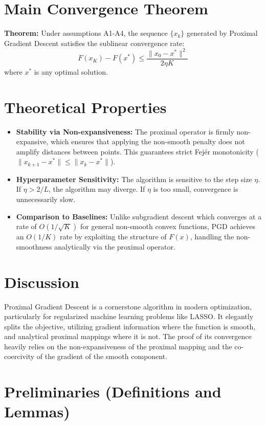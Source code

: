 \documentclass[11pt]{article}
\begin{document}
\section*{Main Convergence Theorem}
\textbf{Theorem:} Under assumptions A1-A4, the sequence $\{x_k\}$ generated by Proximal Gradient Descent satisfies the sublinear convergence rate:
$$F(x_K) - F(x^*) \le \frac{\|x_0 - x^*\|^2}{2\eta K}$$
where $x^*$ is any optimal solution.

\section*{Theoretical Properties}
\begin{itemize}
    \item \textbf{Stability via Non-expansiveness:} The proximal operator is firmly non-expansive, which ensures that applying the non-smooth penalty does not amplify distances between points. This guarantees strict Fejér monotonicity ($\|x_{k+1} - x^*\| \le \|x_k - x^*\|$).
    \item \textbf{Hyperparameter Sensitivity:} The algorithm is sensitive to the step size $\eta$. If $\eta > 2/L$, the algorithm may diverge. If $\eta$ is too small, convergence is unnecessarily slow. 
    \item \textbf{Comparison to Baselines:} Unlike subgradient descent which converges at a rate of $O(1/\sqrt{K})$ for general non-smooth convex functions, PGD achieves an $O(1/K)$ rate by exploiting the structure of $F(x)$, handling the non-smoothness analytically via the proximal operator.
\end{itemize}

\section*{Discussion}
Proximal Gradient Descent is a cornerstone algorithm in modern optimization, particularly for regularized machine learning problems like LASSO. It elegantly splits the objective, utilizing gradient information where the function is smooth, and analytical proximal mappings where it is not. The proof of its convergence heavily relies on the non-expansiveness of the proximal mapping and the co-coercivity of the gradient of the smooth component.

\section*{Preliminaries (Definitions and Lemmas)}
\end{document}
